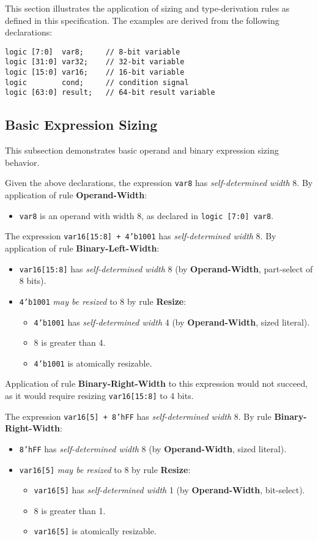 \documentclass{article}
\newcommand{\add}{\color{darkgreen}}
\newcommand{\sv}[1]{{\color{black}\texttt{#1}}}
\newcommand{\sds}{\emph{self-determined width}}
\newcommand{\mbr}{\emph{may be resized}}
\begin{document}
{
\add{}
This section illustrates the application of sizing and type-derivation
rules as defined in this specification. The examples are derived from
the following declarations:
{
\color{black}
\begin{verbatim}
logic [7:0]  var8;     // 8-bit variable
logic [31:0] var32;    // 32-bit variable
logic [15:0] var16;    // 16-bit variable
logic        cond;     // condition signal
logic [63:0] result;   // 64-bit result variable
\end{verbatim}
}

\subsection{Basic Expression Sizing}

This subsection demonstrates basic operand and binary expression
sizing behavior.

Given the above declarations, the expression \sv{var8} has \sds{} 8.
By application of rule \textbf{Operand-Width}:
\begin{itemize}
  \item \sv{var8} is an operand with width 8, as declared
    in \sv{logic [7:0] var8}.
\end{itemize}

The expression \sv{var16[15:8] + 4'b1001} has \sds{} 8.
By application of rule \textbf{Binary-Left-Width}:
\begin{itemize}
  \item \sv{var16[15:8]} has \sds{} 8 (by
    \textbf{Operand-Width}, part-select of 8 bits).
  \item \sv{4'b1001} \mbr{} to 8 by rule \textbf{Resize}:
    \begin{itemize}
      \item \sv{4'b1001} has \sds{} 4 (by
        \textbf{Operand-Width}, sized literal).
      \item 8 is greater than 4.
      \item \sv{4'b1001} is atomically resizable.
    \end{itemize}
\end{itemize}

Application of rule \textbf{Binary-Right-Width} to this expression
would not succeed, as it would require resizing \sv{var16[15:8]} to
4 bits.

The expression \sv{var16[5] + 8'hFF} has \sds{} 8. By rule
\textbf{Binary-Right-Width}:
\begin{itemize}
  \item \sv{8'hFF} has \sds{} 8 (by \textbf{Operand-Width},
    sized literal).
  \item \sv{var16[5]} \mbr{} to 8 by rule \textbf{Resize}:
    \begin{itemize}
      \item \sv{var16[5]} has \sds{} 1 (by
        \textbf{Operand-Width}, bit-select).
      \item 8 is greater than 1.
      \item \sv{var16[5]} is atomically resizable.
    \end{itemize}
\end{itemize}

}
\end{document}
